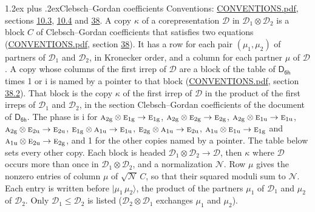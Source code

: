 \documentclass[10pt,a4paper]{article}
\makeatletter
\renewcommand\section{\@startsection{section}{1}{\z@}{-3ex plus -1ex minus -.2ex}%
  {1.2ex plus .2ex}{\normalfont\large\sffamily\bfseries\color{parttitle}}}
\numberwithin{equation}{section}
\newcommand{\grp}[1]{\mathsf{#1}}
\newcommand{\irr}[1]{\text{\normalfont\scshape #1}}
\newcommand{\ptag}[1]{\mathrm{#1}}
\newcommand{\iunit}{\mathrm{i}}
\newcommand{\irrprod}{\otimes}
\newcommand{\mult}{\kappa}
\newcommand{\intx}{\mu}
\newcommand{\cgnorm}{\mathcal{N}}
\newcommand{\prodket}[2]{\lvert {#1}\,{#2}\rangle}
\makeatother
\begin{document}
\section{Clebsch--Gordan coefficients}\label{s:clebsch_gordan}
Conventions: \href{../../CONVENTIONS.pdf}{CONVENTIONS.pdf}, sections \href{../../../rotation/CONVENTIONS.pdf\#conv.10.3}{10.3}, \href{../../../rotation/CONVENTIONS.pdf\#conv.10.4}{10.4} and \href{../../CONVENTIONS.pdf\#conv.38}{38}.
\leavevmode\label{n:index.copy}\label{n:matrix.cg.stored}A copy $\mult$ of a corepresentation $\mathcal{D}$ in $\mathcal{D}_1\irrprod\mathcal{D}_2$ is a block $C$ of Clebsch--Gordan coefficients that satisfies two equations (\href{../../CONVENTIONS.pdf}{CONVENTIONS.pdf}, section \href{../../CONVENTIONS.pdf\#conv.38}{38}). \label{n:index.cg}It has a row for each pair $(\intx_1, \intx_2)$ of partners of $\mathcal{D}_1$ and $\mathcal{D}_2$, in Kronecker order, and a column for each partner $\intx$ of $\mathcal{D}$.
A copy whose columns of the first irrep of $\mathcal{D}$ are a block of the table of $\grp{D_{6h}}$ times 1 or $\iunit$ is named by a pointer to that block (\href{../../CONVENTIONS.pdf}{CONVENTIONS.pdf}, section \href{../../CONVENTIONS.pdf\#conv.38.2}{38.2}). That block is the copy $\mult$ of the first irrep of $\mathcal{D}$ in the product of the first irreps of $\mathcal{D}_1$ and $\mathcal{D}_2$, in the section Clebsch--Gordan coefficients of the document of \href{../../../rotation/data/pdf/D6h.pdf}{$\grp{D_{6h}}$}. The phase is $\iunit$ for $\irr{a}_{2\ptag{g}}\irrprod \irr{e}_{1\ptag{g}}\to \irr{e}_{1\ptag{g}}$, $\irr{a}_{2\ptag{g}}\irrprod \irr{e}_{2\ptag{g}}\to \irr{e}_{2\ptag{g}}$, $\irr{a}_{2\ptag{g}}\irrprod \irr{e}_{1\ptag{u}}\to \irr{e}_{1\ptag{u}}$, $\irr{a}_{2\ptag{g}}\irrprod \irr{e}_{2\ptag{u}}\to \irr{e}_{2\ptag{u}}$, $\irr{e}_{1\ptag{g}}\irrprod \irr{a}_{1\ptag{u}}\to \irr{e}_{1\ptag{u}}$, $\irr{e}_{2\ptag{g}}\irrprod \irr{a}_{1\ptag{u}}\to \irr{e}_{2\ptag{u}}$, $\irr{a}_{1\ptag{u}}\irrprod \irr{e}_{1\ptag{u}}\to \irr{e}_{1\ptag{g}}$ and $\irr{a}_{1\ptag{u}}\irrprod \irr{e}_{2\ptag{u}}\to \irr{e}_{2\ptag{g}}$, and 1 for the other copies named by a pointer. The table below sets every other copy.
Each block is headed $\mathcal{D}_1\irrprod\mathcal{D}_2\to\mathcal{D}$, then $\mult$ where $\mathcal{D}$ occurs more than once in $\mathcal{D}_1\irrprod\mathcal{D}_2$, and a normalization $\cgnorm$. Row $\intx$ gives the nonzero entries of column $\intx$ of $\sqrt{\cgnorm}\,C$, so that their squared moduli sum to $\cgnorm$. \label{n:vector.ket.product}Each entry is written before $\prodket{\intx_1}{\intx_2}$, the product of the partners $\intx_1$ of $\mathcal{D}_1$ and $\intx_2$ of $\mathcal{D}_2$. Only $\mathcal{D}_1 \le \mathcal{D}_2$ is listed ($\mathcal{D}_2\irrprod\mathcal{D}_1$ exchanges $\intx_1$ and $\intx_2$).
\end{document}
